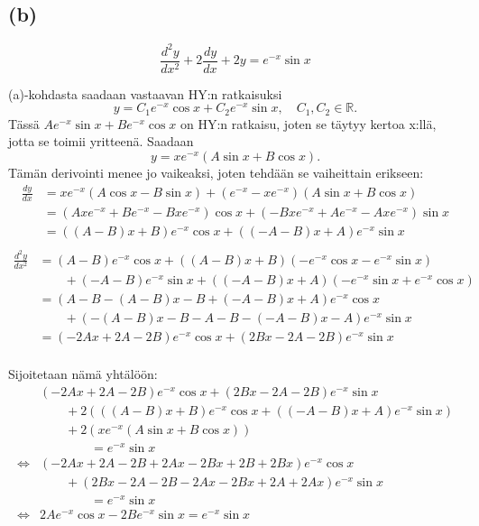\documentclass{article}
\begin{document}
\subsection*{(b)}

\[
  \frac{d^2 y}{d x^2} + 2\frac{dy}{dx} + 2y = e^{-x}\sin x
\]

(a)-kohdasta saadaan vastaavan HY:n ratkaisuksi
\[
  y = C_1e^{-x}\cos x + C_2e^{-x}\sin x, \quad C_1,C_2 \in \mathbb{R}.
\]
Tässä $Ae^{-x}\sin x + Be^{-x}\cos x$ on HY:n ratkaisu, joten se täytyy kertoa x:llä,
jotta se toimii yritteenä. Saadaan
\[
  y = xe^{-x}(A\sin x + B\cos x).
\]
Tämän derivointi menee jo vaikeaksi, joten tehdään se vaiheittain erikseen:
\begin{align*}
  \frac{dy}{dx} &= xe^{-x}(A\cos x - B\sin x) + (e^{-x} - xe^{-x})(A\sin x + B\cos x) \\
                &= (Axe^{-x} + Be^{-x} - Bxe^{-x})\cos x + (-Bxe^{-x} + Ae^{-x} - Axe^{-x})\sin x \\
                &= ((A - B)x + B)e^{-x}\cos x + ((-A - B)x + A)e^{-x}\sin x \\
\end{align*}
\begin{align*}
  \frac{d^2 y}{d x^2} &= (A - B)e^{-x}\cos x + ((A-B)x + B)(-e^{-x}\cos x - e^{-x}\sin x) \\
                      &\qquad+ (-A - B)e^{-x}\sin x + ((-A-B)x + A)(-e^{-x}\sin x + e^{-x}\cos x) \\
                      &= (A - B - (A-B)x - B + (-A-B)x + A)e^{-x}\cos x \\
                      &\qquad + (-(A-B)x - B - A - B - (-A-B)x - A)e^{-x}\sin x \\
                      &= (-2Ax + 2A - 2B)e^{-x}\cos x + (2Bx - 2A - 2B)e^{-x}\sin x \\
\end{align*}

Sijoitetaan nämä yhtälöön:
\begin{align*}
  &(-2Ax + 2A - 2B)e^{-x}\cos x + (2Bx - 2A - 2B)e^{-x}\sin x \\
  &\qquad + 2(((A - B)x + B)e^{-x}\cos x + ((-A - B)x + A)e^{-x}\sin x) \\
  &\qquad + 2(xe^{-x}(A\sin x + B\cos x)) \\
  &\qquad\qquad = e^{-x}\sin x \\
  \iff&(-2Ax + 2A - 2B + 2Ax - 2Bx + 2B + 2Bx)e^{-x}\cos x \\
  &\qquad + (2Bx - 2A - 2B - 2Ax - 2Bx + 2A + 2Ax)e^{-x}\sin x \\
  &\qquad\qquad= e^{-x}\sin x \\
  \iff&2Ae^{-x}\cos x - 2Be^{-x}\sin x = e^{-x}\sin x \\
\end{align*}
\end{document}
